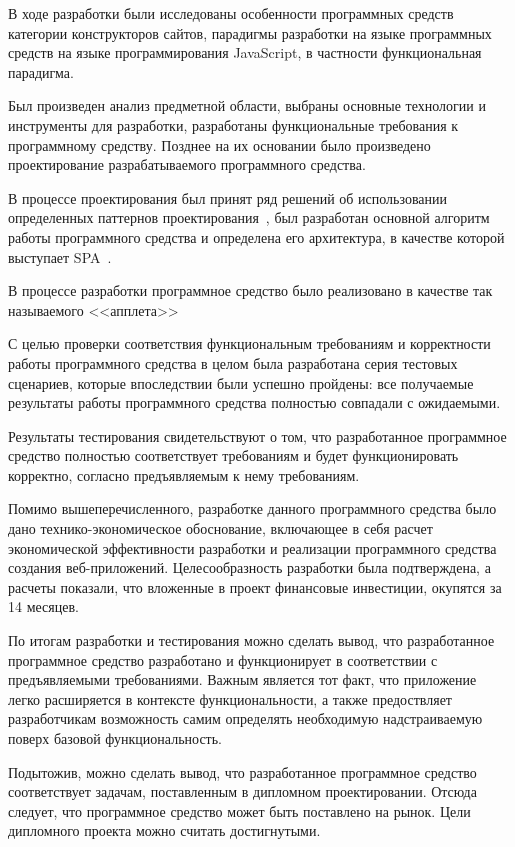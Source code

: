 
В ходе разработки были исследованы особенности программных средств категории конструкторов сайтов, парадигмы разработки на языке программных средств на языке программирования JavaScript, в частности функциональная парадигма.

Был произведен анализ предметной области, выбраны основные технологии и инструменты для разработки, разработаны функциональные требования к программному средству. Позднее на их основании было произведено проектирование разрабатываемого программного средства.

В процессе проектирования был принят ряд решений об использовании определенных паттернов проектирования~\cite{wiki_design_patterns}, был разработан основной алгоритм работы программного средства и определена его архитектура, в качестве которой выступает SPA~\cite{wiki_spa}.

В процессе разработки программное средство было реализовано в качестве так называемого <<апплета>>~\cite{wiki_applet}

С целью проверки соответствия функциональным требованиям и корректности работы программного средства в целом была разработана серия тестовых сценариев, которые впоследствии были успешно пройдены: все получаемые результаты работы программного средства полностью совпадали с ожидаемыми.

Результаты тестирования свидетельствуют о том, что разработанное программное средство полностью соответствует требованиям и будет функционировать корректно, согласно предъявляемым к нему требованиям.

Помимо вышеперечисленного, разработке данного программного средства было дано технико-экономическое обоснование, включающее в себя расчет экономической эффективности разработки и реализации программного средства создания веб-приложений. Целесообразность разработки была подтверждена, а расчеты показали, что вложенные в проект финансовые инвестиции, окупятся за 14 месяцев.

По итогам разработки и тестирования можно сделать вывод, что разработанное программное средство разработано и функционирует в соответствии с предъявляемыми требованиями. Важным является тот факт, что приложение легко расширяется в контексте функциональности, а также предоствляет разработчикам возможность самим определять необходимую надстраиваемую поверх базовой функциональность.

Подытожив, можно сделать вывод, что разработанное программное средство соответствует задачам, поставленным в дипломном проектировании. Отсюда следует, что программное средство может быть поставлено на рынок. Цели дипломного проекта можно считать достигнутыми.